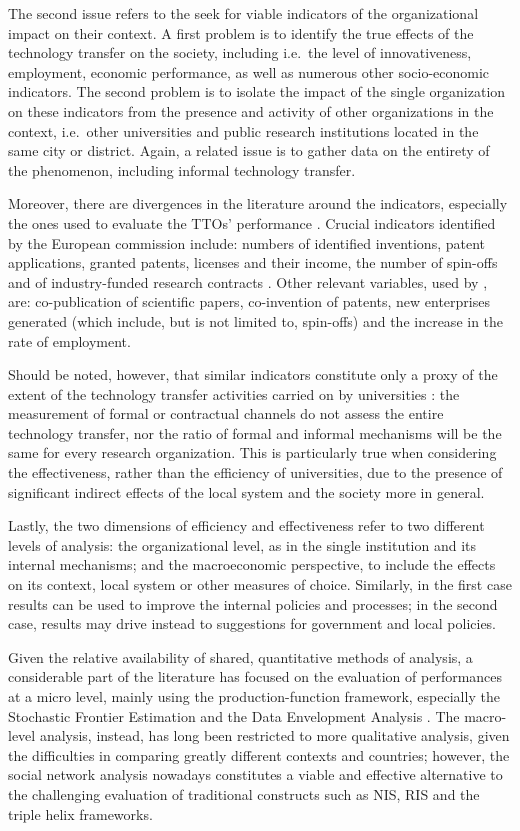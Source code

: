 The second issue refers to the seek for viable indicators of the organizational impact on their context. A first problem is to identify the true effects of the technology transfer on the society, including i.e.\ the level of innovativeness, employment, economic performance, as well as numerous other socio-economic indicators. The second problem is to isolate the impact of the single organization on these indicators from the presence and activity of other organizations in the context, i.e.\ other universities and public research institutions located in the same city or district. Again, a related issue is to gather data on the entirety of the phenomenon, including informal technology transfer. 

Moreover, there are divergences in the literature around the indicators, especially the ones used to evaluate the TTOs' performance \citep{Muscio2010}. Crucial indicators identified by the European commission include: numbers of identified inventions, patent applications, granted patents, licenses and their income, the number of spin-offs and of industry-funded research contracts \citep{Balderi2010}. Other relevant variables, used by \citet{Guerrero2014}, are: co-publication of scientific papers, co-invention of patents, new enterprises generated (which include, but is not limited to, spin-offs) and the increase in the rate of employment. 

Should be noted, however, that similar indicators constitute only a proxy of the extent of the technology transfer activities carried on by universities \citep{Leydesdorff2010}: the measurement of formal or contractual channels do not assess the entire technology transfer, nor the ratio of formal and informal mechanisms will be the same for every research organization. This is particularly true when considering the effectiveness, rather than the efficiency of universities, due to the presence of significant indirect effects of the local system and the society more in general.

Lastly, the two dimensions of efficiency and effectiveness refer to two different levels of analysis: the organizational level, as in the single institution and its internal mechanisms; and the macroeconomic perspective, to include the effects on its context, local system or other measures of choice. Similarly, in the first case results can be used to improve the internal policies and processes; in the second case, results may drive instead to suggestions for government and local policies.

Given the relative availability of shared, quantitative methods of analysis, a considerable part of the literature has focused on the evaluation of performances at a micro level, mainly using the production-function framework, especially the Stochastic Frontier Estimation and the Data Envelopment Analysis \citep{Siegel2007}. The macro-level analysis, instead, has long been restricted to more qualitative analysis, given the difficulties in comparing greatly different contexts and countries; however, the social network analysis nowadays constitutes a viable and effective alternative to the challenging evaluation of traditional constructs such as NIS, RIS and the triple helix frameworks.

